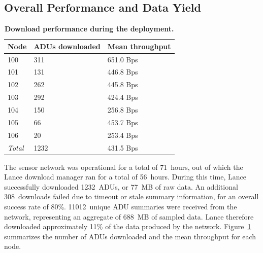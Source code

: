 \subsection{Overall Performance and Data Yield}

\begin{table}[t]
\begin{center}
\begin{tabular}{|l|l|l|} \hline
\textbf{Node}	& \textbf{ADUs downloaded} & \textbf{Mean throughput} \\ \hline
100 & 311 & 651.0 Bps \\
101 & 131 & 446.8 Bps \\
102 & 262 & 445.8 Bps \\
103 & 292 & 424.4 Bps \\
104 & 150 & 256.8 Bps \\
105 & 66 & 453.7 Bps \\
106 & 20 & 253.4 Bps \\ \hline
\textit{Total} & 1232 & 431.5 Bps \\ \hline
\end{tabular}
\end{center}

\caption{\textbf{Download performance during the deployment.}}

\label{lance-fig-throughput}
\end{table}

The sensor network was operational for a total of 71~hours, out of which the
Lance download manager ran for a total of 56~hours. During this time, Lance
successfully downloaded 1232~ADUs, or 77~MB of raw data. An additional
308~downloads failed due to timeout or stale summary information, for an
overall success rate of 80\%. 11012~unique ADU summaries were received from
the network, representing an aggregate of 688~MB of sampled data. Lance
therefore downloaded approximately 11\% of the data produced by the network.
Figure~\ref{lance-fig-throughput} summarizes the number of ADUs downloaded
and the mean throughput for each node.

